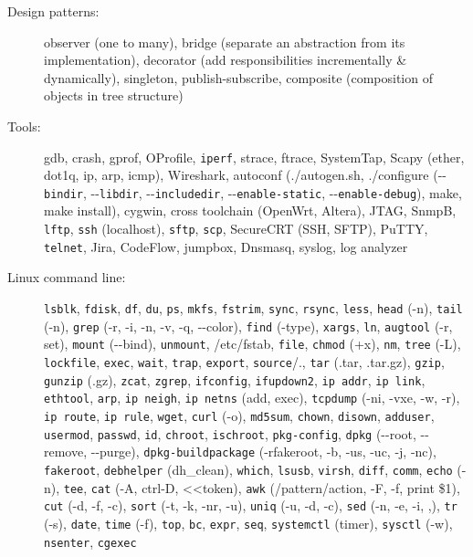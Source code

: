 \documentclass[letterpaper,11pt]{article}
\begin{document}
\begin{description}
\item[Design patterns:] observer (one to many), bridge (separate an abstraction from its implementation),
decorator (add responsibilities incrementally \& dynamically), singleton, publish-subscribe, composite (composition of objects in tree structure)

\item[Tools:] gdb, crash, gprof, OProfile, {\tt iperf},
strace, ftrace, SystemTap,
Scapy (ether, dot1q, ip, arp, icmp), Wireshark, autoconf (./autogen.sh,
./configure (-{}-{\tt bindir}, -{}-{\tt libdir}, -{}-{\tt includedir}, -{}-{\tt enable-static}, -{}-{\tt enable-debug}),
make, make install), cygwin, cross toolchain (OpenWrt, Altera),
JTAG, SnmpB,
{\tt lftp}, {\tt ssh} (localhost), {\tt sftp}, {\tt scp}, SecureCRT (SSH, SFTP), PuTTY, {\tt telnet},
Jira, CodeFlow,
jumpbox, Dnsmasq, syslog, log analyzer

\item[Linux command line:] {\tt lsblk}, {\tt fdisk}, {\tt df}, {\tt du},
{\tt ps},
{\tt mkfs}, {\tt fstrim}, {\tt sync},
{\tt rsync}, {\tt less}, {\tt head} (-n), {\tt tail} (-n), {\tt grep} (-r, -i, -n, -v, -q, -{}-color),
{\tt find} (-type), {\tt xargs}, {\tt ln}, {\tt augtool} (-r, set),
{\tt mount} (-{}-bind), {\tt unmount}, /etc/fstab,
{\tt file}, {\tt chmod} (+x), {\tt nm}, {\tt tree} (-L), {\tt lockfile},
{\tt exec}, {\tt wait}, {\tt trap},
{\tt export}, {\tt source}/.,
{\tt tar} (.tar, .tar.gz), {\tt gzip}, {\tt gunzip} (.gz), {\tt zcat}, {\tt zgrep},
{\tt ifconfig}, {\tt ifupdown2}, {\tt ip addr}, {\tt ip link}, {\tt ethtool}, {\tt arp}, {\tt ip neigh}, {\tt ip netns} (add, exec),
{\tt tcpdump} (-ni, -vxe, -w, -r), {\tt ip route}, {\tt ip rule},
{\tt wget}, {\tt curl} (-o), {\tt md5sum},
{\tt chown}, {\tt disown}, {\tt adduser}, {\tt usermod}, {\tt passwd}, {\tt id}, {\tt chroot}, {\tt ischroot},
{\tt pkg-config}, {\tt dpkg} (-{}-root, -{}-remove, -{}-purge),
{\tt dpkg-buildpackage} (-rfakeroot, -b, -us, -uc, -j, -nc), {\tt fakeroot}, {\tt debhelper} (dh\_clean),
{\tt which},
{\tt lsusb},
{\tt virsh},
{\tt diff}, {\tt comm},
{\tt echo} (-n), {\tt tee}, {\tt cat} (-A, ctrl-D, \textless\textless token), {\tt awk} (/pattern/action, -F, -f, print \$1), {\tt cut} (-d, -f, -c),
{\tt sort} (-t, -k, -nr, -u), {\tt uniq} (-u, -d, -c), {\tt sed} (-n, -e, -i, ,), {\tt tr} (-s),
{\tt date}, {\tt time} (-f),
{\tt top},
{\tt bc}, {\tt expr}, {\tt seq},
{\tt systemctl} (timer), {\tt sysctl} (-w),
{\tt nsenter}, {\tt cgexec}


\end{description}
\end{document}
